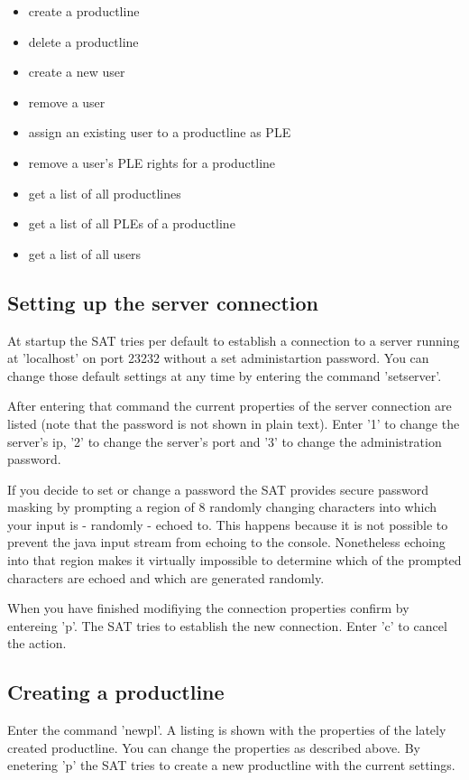 \begin{itemize}
	\item create a productline
	\item delete a productline
	\item create a new user
	\item remove a user
	\item assign an existing user to a productline as PLE
	\item remove a user's PLE rights for a productline
	\item get a list of all productlines
	\item get a list of all PLEs of a productline
	\item get a list of all users
\end{itemize}




\subsection{Setting up the server connection}
At startup the SAT tries per default to establish a connection to a server running 
at 'localhost' on port 23232 without a set administartion password. You can change
those default settings at any time by entering the command 'setserver'.\par

After entering that command the current properties of the server connection are 
listed (note that the password is not shown in plain text). Enter '1' to change
the server's ip, '2' to change the server's port and '3' to change the administration
password.\par

If you decide to set or change a password the SAT provides secure password masking by
prompting a region of 8 randomly changing characters into which your input is - randomly - 
echoed to. This happens because it is not possible to prevent the java input stream from
echoing to the console. Nonetheless echoing into that region makes it virtually impossible 
to determine which of the prompted characters are echoed and which are generated randomly.\par

When you have finished modifiying the connection properties confirm by entereing 'p'. The SAT 
tries to establish the new connection. Enter 'c' to cancel the action.

\subsection{Creating a productline}
Enter the command 'newpl'. A listing is shown with the properties of the lately created
productline. You can change the properties as described above. By enetering 'p' the SAT
tries to create a new productline with the current settings. \par

